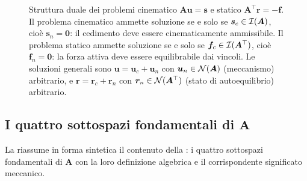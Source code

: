 \begin{figure}[htbp]
\begin{tikzpicture}[>=Stealth, line width=0.8pt, scale=0.8]
	\end{tikzpicture}
	\caption{Struttura duale dei problemi cinematico $\bm{A}\bm{u} = \bm{s}$
		e statico $\bm{A}^\top\bm{r} = -\bm{f}$. Il problema cinematico ammette
		soluzione se e solo se $\bm{s}_c \in \mathcal{I}(\bm{A})$, cioè $\bm{s}_n = \bm{0}$:
		il cedimento deve essere cinematicamente ammissibile. Il problema statico
		ammette soluzione se e solo se $\bm{f}_c \in \mathcal{I}(\bm{A}^\top)$, cioè
		$\bm{f}_n = \bm{0}$: la forza attiva deve essere equilibrabile dai vincoli.
		Le soluzioni generali sono $\bm{u} = \bm{u}_c + \bm{u}_n$ con
		$\bm{u}_n \in \mathcal{N}(\bm{A})$ (meccanismo) arbitrario, e
		$\bm{r} = \bm{r}_c + \bm{r}_n$ con $\bm{r}_n \in \mathcal{N}(\bm{A}^\top)$
		(stato di autoequilibrio) arbitrario.}
	\label{fig:problemi_duali_SCR}
\end{figure}


\subsection{I quattro sottospazi fondamentali di \texorpdfstring{$\bm{A}$}{A}}
\label{sec:sottospazi}

La  riassume in forma sintetica il
contenuto della : i quattro sottospazi
fondamentali di $\bm{A}$ con la loro definizione algebrica e il
corrispondente significato meccanico.

